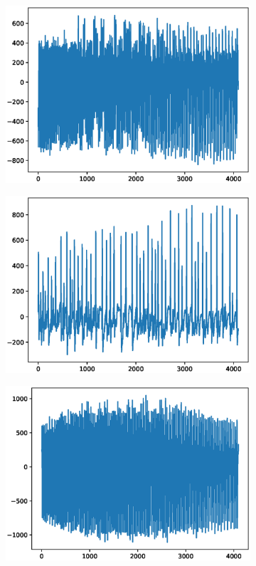 \documentclass[12pt]{article}
\begin{document}
\begin{figure}
\begin{subfigure}{.25\textwidth}
  \centering
  \includegraphics[width=.8\linewidth]{figures/signals/E/S042.eps}
\end{subfigure}%
\begin{subfigure}{.25\textwidth}
  \centering
  \includegraphics[width=.8\linewidth]{figures/signals/E/S056.eps}
\end{subfigure}
\begin{subfigure}{.25\textwidth}
  \centering
  \includegraphics[width=.8\linewidth]{figures/signals/E/S080.eps}

\end{subfigure}
\end{figure}
\end{document}
